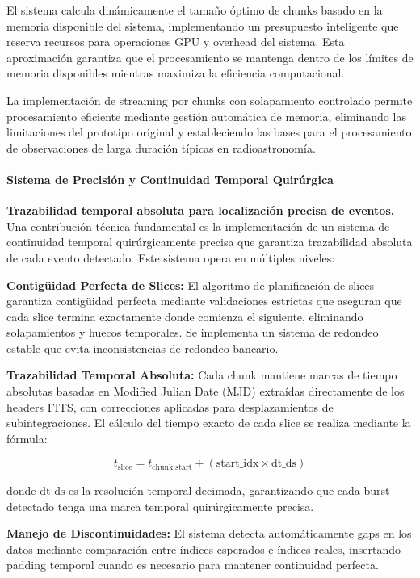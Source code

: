 El sistema calcula dinámicamente el tamaño óptimo de chunks basado en la memoria disponible del sistema, implementando un presupuesto inteligente que reserva recursos para operaciones GPU y overhead del sistema. Esta aproximación garantiza que el procesamiento se mantenga dentro de los límites de memoria disponibles mientras maximiza la eficiencia computacional.

La implementación de streaming por chunks con solapamiento controlado permite procesamiento eficiente mediante gestión automática de memoria, eliminando las limitaciones del prototipo original y estableciendo las bases para el procesamiento de observaciones de larga duración típicas en radioastronomía.

\paragraph{Sistema de Precisión y Continuidad Temporal Quirúrgica}

\noindent\textbf{Trazabilidad temporal absoluta para localización precisa de eventos.} Una contribución técnica fundamental es la implementación de un sistema de continuidad temporal quirúrgicamente precisa que garantiza trazabilidad absoluta de cada evento detectado. Este sistema opera en múltiples niveles:

\textbf{Contigüidad Perfecta de Slices:} El algoritmo de planificación de slices garantiza contigüidad perfecta mediante validaciones estrictas que aseguran que cada slice termina exactamente donde comienza el siguiente, eliminando solapamientos y huecos temporales. Se implementa un sistema de redondeo estable que evita inconsistencias de redondeo bancario.

\textbf{Trazabilidad Temporal Absoluta:} Cada chunk mantiene marcas de tiempo absolutas basadas en Modified Julian Date (MJD) extraídas directamente de los headers FITS, con correcciones aplicadas para desplazamientos de subintegraciones. El cálculo del tiempo exacto de cada slice se realiza mediante la fórmula:

\[
t_{\text{slice}} = t_{\text{chunk\_start}} + (\text{start\_idx} \times \text{dt\_ds})
\]

donde $\text{dt\_ds}$ es la resolución temporal decimada, garantizando que cada burst detectado tenga una marca temporal quirúrgicamente precisa.

\textbf{Manejo de Discontinuidades:} El sistema detecta automáticamente gaps en los datos mediante comparación entre índices esperados e índices reales, insertando padding temporal cuando es necesario para mantener continuidad perfecta.


